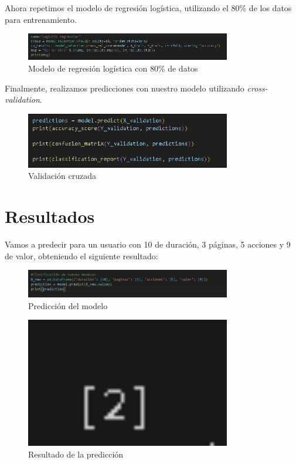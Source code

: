 \documentclass{article}
\begin{document}
Ahora repetimos el modelo de regresión logística, utilizando el 80\% de los datos para entrenamiento.

\begin{figure}[H]
    \centering
    \includegraphics[width=0.8\textwidth]{img/11.png}
    \caption{Modelo de regresión logística con 80\% de datos}
\end{figure}

Finalmente, realizamos predicciones con nuestro modelo utilizando \textit{cross-validation}.

\begin{figure}[H]
    \centering
    \includegraphics[width=0.8\textwidth]{img/12.png}
    \caption{Validación cruzada}
\end{figure}

\section{Resultados}

Vamos a predecir para un usuario con 10 de duración, 3 páginas, 5 acciones y 9 de valor, obteniendo el siguiente resultado:

\begin{figure}[H]
    \centering
    \includegraphics[width=0.8\textwidth]{img/13.png}
    \caption{Predicción del modelo}
\end{figure}

\begin{figure}[H]
    \centering
    \includegraphics[width=0.8\textwidth]{img/14.png}
    \caption{Resultado de la predicción}
\end{figure}
\end{document}
